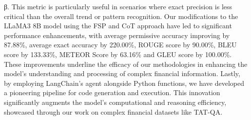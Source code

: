 \documentclass[logo,msc]{infthesis}           %
\begin{document}
β. This metric is particularly useful in scenarios where exact precision is less critical than the overall trend or pattern recognition. Our modifications to the LLaMA3 8B model using the FSP and CoT approach have led to significant performance enhancements, with average permissive accuracy improving by 87.88\%, average exact accuracy by 220.00\%, ROUGE score by 90.00\%, BLEU score by 133.33\%, METEOR Score by 63.16\% and GLEU score by 100.00\%. These improvements underline the efficacy of our methodologies in enhancing the model's understanding and processing of complex financial information. Lastly, by employing LangChain’s agent alongside Python functions, we have developed a pioneering pipeline for code generation and execution. This innovation significantly augments the model's computational and reasoning efficiency, showcased through our work on complex financial datasets like TAT-QA.


\end{document}
